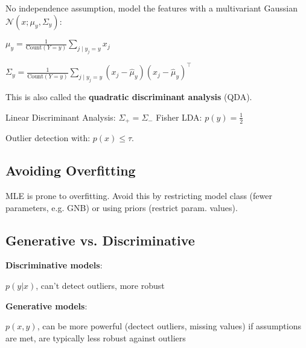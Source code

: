 No independence assumption, model the features with a multivariant Gaussian $\mathcal{N}(x; \mu_y, \Sigma_y)$:

\quad $\mu_{y} = \frac{1}{\text{Count}(Y = y)} \sum_{j \; | \; y_j = y} x_{j}$

\quad $\Sigma_{y} = \frac{1}{\text{Count}(Y = y)} \sum_{j \; | \; y_j = y} (x_{j} - \hat \mu_{y}) (x_{j} - \hat \mu_{y})^\top$

This is also called the \textbf{quadratic discriminant analysis} (QDA). 

Linear Discriminant Analysis: $\Sigma_+ = \Sigma_-$
Fisher LDA: $p(y) = \frac{1}{2}$

Outlier detection with: $p(x) \leq \tau$.

\subsection*{Avoiding Overfitting}

MLE is prone to overfitting. Avoid this by restricting model class (fewer parameters, e.g. GNB) or using priors (restrict param. values).

\subsection*{Generative vs. Discriminative}

\textbf{Discriminative models}:

$p(y | x)$, can't detect outliers, more robust

\textbf{Generative models}:

$p(x,y)$, can be more powerful (dectect outliers, missing values) if assumptions are met, are typically less robust against outliers
